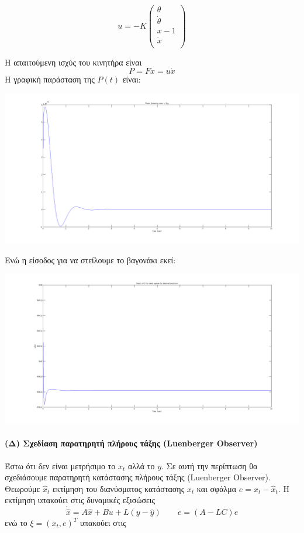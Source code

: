 \documentclass[a4paper,oneside, 12pt]{article}
\begin{document}
$$u = - K 
\begin{pmatrix}
\theta \\ \dot \theta \\ x - 1 \\ \dot x \\ 
\end{pmatrix}$$


Η απαιτούμενη ισχύς του κινητήρα είναι $$P = F \dot x = u \dot x $$ Η γραφική παράσταση της $P(t)$ είναι:

\includegraphics[width=\textwidth]{power.png}

Ενώ η είσοδος για να στείλουμε το βαγονάκι εκεί: 

\includegraphics[width=\textwidth]{input.png}


\paragraph{(Δ) Σχεδίαση παρατηρητή πλήρους τάξης (Luenberger Observer)} Έστω ότι δεν είναι μετρήσιμο το $x_t$ αλλά το $y$. Σε αυτή την περίπτωση θα σχεδιάσουμε παρατηρητή κατάστασης πλήρους τάξης (Luenberger Observer). Θεωρούμε $\hat x_t $ εκτίμηση του διανύσματος κατάστασης $x_t$ και σφάλμα $e = x_t - \hat x_t$. Η εκτίμηση υπακούει στις δυναμικές εξισώσεις $$\dot {\hat x} = A \hat x + Bu + L (y - \hat y) \qquad \dot e = (A - LC) e $$ ενώ το $\xi = (x_t, e)^T$ υπακούει στις 
\end{document}
